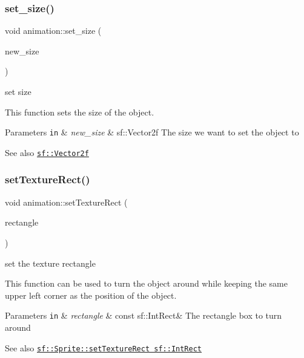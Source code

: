 \subsubsection{\texorpdfstring{set\+\_\+size()}{set\_size()}}
{\footnotesize\ttfamily void animation\+::set\+\_\+size (\begin{DoxyParamCaption}\item[{sf\+::\+Vector2f}]{new\+\_\+size }\end{DoxyParamCaption})}



set size 

This function sets the size of the object.


\begin{DoxyParams}[1]{Parameters}
\mbox{\tt in}  & {\em new\+\_\+size} & sf\+::\+Vector2f The size we want to set the object to \\
\hline
\end{DoxyParams}
\begin{DoxySeeAlso}{See also}
\href{https://www.sfml-dev.org/documentation/2.0/classsf_1_1Vector2.php }{\tt sf\+::\+Vector2f} 
\end{DoxySeeAlso}
\mbox{\label{classanimation_a30e84ff71206b8ec4f82fd70ad776036}} 
\subsubsection{\texorpdfstring{set\+Texture\+Rect()}{setTextureRect()}}
{\footnotesize\ttfamily void animation\+::set\+Texture\+Rect (\begin{DoxyParamCaption}\item[{const sf\+::\+Int\+Rect \&}]{rectangle }\end{DoxyParamCaption})}



set the texture rectangle 

This function can be used to turn the object around while keeping the same upper left corner as the position of the object.


\begin{DoxyParams}[1]{Parameters}
\mbox{\tt in}  & {\em rectangle} & const sf\+::\+Int\+Rect\& The rectangle box to turn around \\
\hline
\end{DoxyParams}
\begin{DoxySeeAlso}{See also}
\href{https://www.sfml-dev.org/documentation/2.0/classsf_1_1Sprite.php#a3fefec419a4e6a90c0fd54c793d82ec2 }{\tt sf\+::\+Sprite\+::set\+Texture\+Rect sf\+::\+Int\+Rect} 
\end{DoxySeeAlso}


